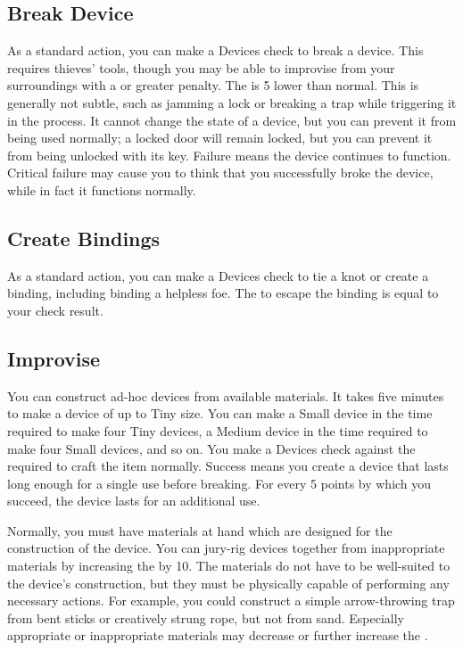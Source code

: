     \subsection{Break Device}
        As a standard action, you can make a Devices check to break a device.
        This requires thieves' tools, though you may be able to improvise from your surroundings with a  or greater penalty.
        The  is 5 lower than normal. This is generally not subtle, such as jamming a lock or breaking a trap while triggering it in the process. It cannot change the state of a device, but you can prevent it from being used normally; a locked door will remain locked, but you can prevent it from being unlocked with its key. Failure means the device continues to function. Critical failure may cause you to think that you successfully broke the device, while in fact it functions normally.

    \subsection{Create Bindings}
        As a standard action, you can make a Devices check to tie a knot or create a binding, including binding a helpless foe. The  to escape the binding is equal to your check result.

    \subsection{Improvise}\label{Improvise}
        You can construct ad-hoc devices from available materials.
        It takes five minutes to make a device of up to Tiny size.
        You can make a Small device in the time required to make four Tiny devices, a Medium device in the time required to make four Small devices, and so on.
        You make a Devices check against the  required to craft the item normally.
        Success means you create a device that lasts long enough for a single use before breaking.
        For every 5 points by which you succeed, the device lasts for an additional use.

        Normally, you must have materials at hand which are designed for the construction of the device.
        You can jury-rig devices together from inappropriate materials by increasing the  by 10.
        The materials do not have to be well-suited to the device's construction, but they must be physically capable of performing any necessary actions.
        For example, you could construct a simple arrow-throwing trap from bent sticks or creatively strung rope, but not from sand.
        Especially appropriate or inappropriate materials may decrease or further increase the .


